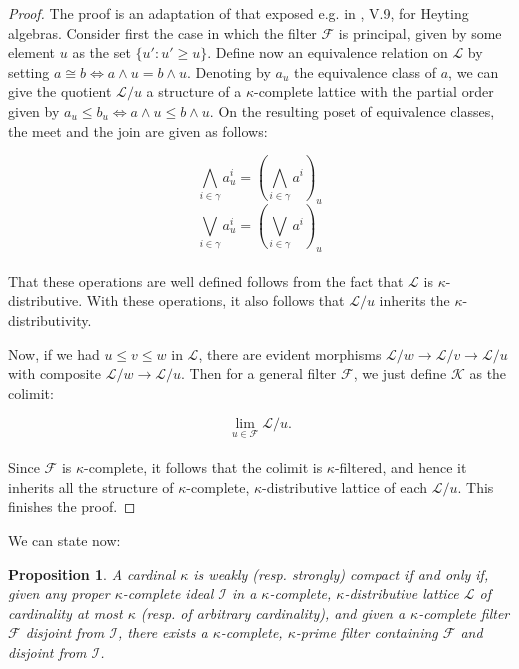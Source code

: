\documentclass[a4paper,11pt]{article}
\theoremstyle{plain}
\newtheorem{proposition}[thm]{Proposition}
\theoremstyle{plain}
\theoremstyle{remark}
\begin{document}
\begin{proof}
The proof is an adaptation of that exposed e.g. in \cite{maclane-moerdijk}, V.9,  for Heyting algebras. Consider first the case in which the filter $\mathcal{F}$ is principal, given by some element $u$ as the set $\{u': u' \geq u\}$. Define now an equivalence relation on $\mathcal{L}$ by setting $a \cong b \iff a \wedge u=b \wedge u$. Denoting by $a_u$ the equivalence class of $a$, we can give the quotient $\mathcal{L}/u$ a structure of a $\kappa$-complete lattice with the partial order given by $a_u \leq b_u \iff a \wedge u \leq b \wedge u$. On the resulting poset of equivalence classes, the meet and the join are given as follows:

$$\bigwedge_{i \in \gamma}a^i_u =\left(\bigwedge_{i \in \gamma}a^i\right)_u$$
$$\bigvee_{i \in \gamma}a^i_u =\left(\bigvee_{i \in \gamma}a^i\right)_u$$
\\
That these operations are well defined follows from the fact that $\mathcal{L}$ is $\kappa$-distributive. With these operations, it also follows that $\mathcal{L}/u$ inherits the $\kappa$-distributivity.  

Now, if we had $u \leq v \leq w$ in $\mathcal{L}$, there are evident morphisms $\mathcal{L}/w \to \mathcal{L}/v \to \mathcal{L}/u$ with composite $\mathcal{L}/w \to \mathcal{L}/u$. Then for a general filter $\mathcal{F}$, we just define $\mathcal{K}$ as the colimit:

$$\lim_{u \in \mathcal{F}}\mathcal{L}/u.$$
\\
Since $\mathcal{F}$ is $\kappa$-complete, it follows that the colimit is $\kappa$-filtered, and hence it inherits all the structure of $\kappa$-complete, $\kappa$-distributive lattice of each $\mathcal{L}/u$. This finishes the proof.
\end{proof}

We can state now:
 
\begin{proposition}\label{filter}
 A cardinal $\kappa$ is weakly (resp. strongly) compact if and only if, given any proper $\kappa$-complete ideal $\mathcal{I}$ in a $\kappa$-complete, $\kappa$-distributive lattice $\mathcal{L}$ of cardinality at most $\kappa$ (resp. of arbitrary cardinality), and given a $\kappa$-complete filter $\mathcal{F}$ disjoint from $\mathcal{I}$, there exists a $\kappa$-complete, $\kappa$-prime filter containing $\mathcal{F}$ and disjoint from $\mathcal{I}$.
\end{proposition}
\end{document}
